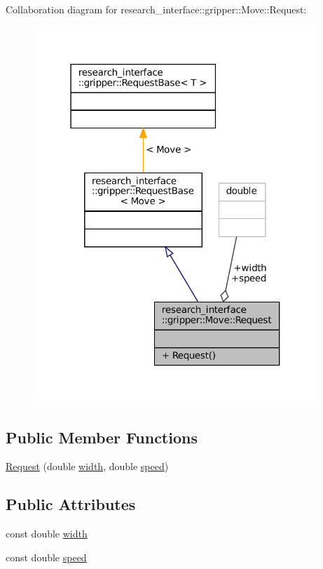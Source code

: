 Collaboration diagram for research\+\_\+interface\+:\+:gripper\+:\+:Move\+:\+:Request\+:
\nopagebreak
\begin{figure}[H]
\begin{center}
\leavevmode
\includegraphics[width=304pt]{structresearch__interface_1_1gripper_1_1Move_1_1Request__coll__graph}
\end{center}
\end{figure}
\subsection*{Public Member Functions}
\begin{DoxyCompactItemize}
\item 
\hyperlink{structresearch__interface_1_1gripper_1_1Move_1_1Request_af4e9e7e0f638a18f69f2d169f90752e3}{Request} (double \hyperlink{structresearch__interface_1_1gripper_1_1Move_1_1Request_a06e31cef24a449bac2ca4410898cab2f}{width}, double \hyperlink{structresearch__interface_1_1gripper_1_1Move_1_1Request_a045b73489d6d309f4927db942d966b8b}{speed})
\end{DoxyCompactItemize}
\subsection*{Public Attributes}
\begin{DoxyCompactItemize}
\item 
const double \hyperlink{structresearch__interface_1_1gripper_1_1Move_1_1Request_a06e31cef24a449bac2ca4410898cab2f}{width}
\item 
const double \hyperlink{structresearch__interface_1_1gripper_1_1Move_1_1Request_a045b73489d6d309f4927db942d966b8b}{speed}
\end{DoxyCompactItemize}



